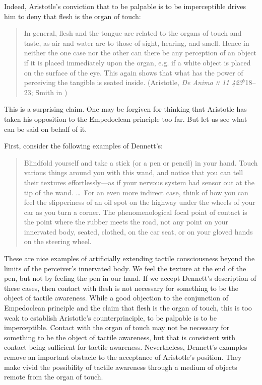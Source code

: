 Indeed, Aristotle's conviction that to be palpable is to be imperceptible drives him to deny that flesh is the organ of touch:
\begin{quote}
    In general, flesh and the tongue are related to the organs of touch and taste, as air and water are to those of sight, hearing, and smell. Hence in neither the one case nor the other can there be any perception of an object if it is placed immediately upon the organ, e.g. if a white object is placed on the surface of the eye. This again shows that what has the power of perceiving the tangible is seated inside. (Aristotle, \emph{De Anima \textsc{ii} 11 423\( ^{b} \)}18--23; Smith in \citealt[42]{Barnes:1984uq})
\end{quote}
This is a surprising claim. One may be forgiven for thinking that Aristotle has taken his opposition to the Empedoclean principle too far. But let us see what can be said on behalf of it.

First, consider the following examples of Dennett's:
\begin{quote}
    Blindfold yourself and take a stick (or a pen or pencil) in your hand. Touch various things around you with this wand, and notice that you can tell their textures effortlessly---as if your nervous system had sensor out at the tip of the wand. \ldots\ For an even more indirect case, think of how you can feel the slipperiness of an oil spot on the highway under the wheels of your car as you turn a corner. The phenomenological focal point of contact is the point where the rubber meets the road, not any point on your innervated body, seated, clothed, on the car seat, or on your gloved hands on the steering wheel. \citep[47]{Dennett:1993ce}
\end{quote}
These are nice examples of artificially extending tactile consciousness beyond the limits of the perceiver's innervated body. We feel the texture at the end of the pen, but not by feeling the pen in our hand. If we accept Dennett's description of these cases, then contact with flesh is not necessary for something to be the object of tactile awareness. While a good objection to the conjunction of Empedoclean principle and the claim that flesh is the organ of touch, this is too weak to establish Aristotle's counterprinciple, to be palpable is to be imperceptible. Contact with the organ of touch may not be necessary for something to be the object of tactile awareness, but that is consistent with contact being sufficient for tactile awareness. Nevertheless, Dennett's examples remove an important obstacle to the acceptance of Aristotle's position. They make vivid the possibility of tactile awareness through a medium of objects remote from the organ of touch.

